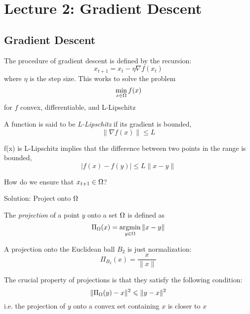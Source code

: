\section{Lecture 2: Gradient Descent}

\subsection{Gradient Descent}


The procedure of gradient descent is defined by the recursion:
\[
x_{t+1} = x_t - \eta \nabla f(x_t)
\]
where $\eta$ is the step size. This works to solve the problem
\[
\min_{x\in\Omega} f(x)
\]
for $f$ convex, differentiable, and L-Lipschitz

\begin{definition}[L-Lipschitz]
A function is said to be \emph{L-Lipschitz} if its gradient is bounded,
\[
\|\nabla f(x)\| \leq L
\]
\end{definition}

\begin{fact}
f(x) is L-Lipschitz implies that the difference between two points in the range is bounded,
\[
|f(x) - f(y)| \leq L \|x - y\|
\]
\end{fact}


\begin{question}
How do we ensure that $x_{t+1}\in\Omega$?
\end{question}

Solution: Project onto $\Omega$

\begin{definition}[Projection]
The \emph{projection} of a point $y$ onto a set $\Omega$ is defined as
\[
\Pi_{\Omega}(x) = \operatorname*{\arg\!\min}_{y\in\Omega} \|x-y\|
\]
\end{definition}

\begin{example}
A projection onto the Euclidean ball $B_2$ is just normalization:
\[
\Pi_{B_2}(x) = \dfrac{x}{\|x\|}
\]
\end{example}


The crucial property of projections is that they satisfy the following condition:
\[
\| \Pi_{\Omega}(y) - x \|^2 \leqslant \| y - x \|^2
\]
i.e. the projection of $y$ onto a convex set containing $x$ is closer to $x$

